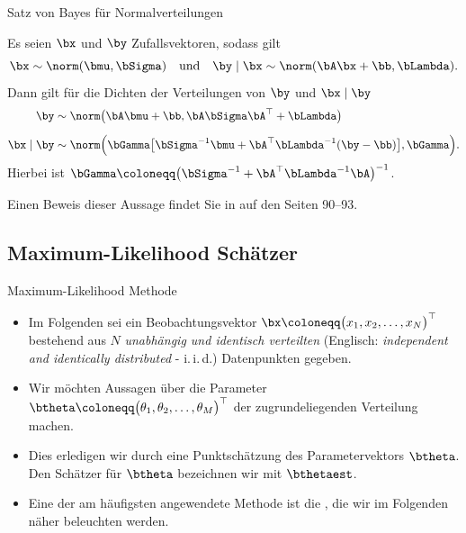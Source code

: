 \begin{frame}{Satz von Bayes für Normalverteilungen}{}
	\begin{mytheo}
		Es seien $\bx$ und $\by$ Zufallsvektoren, sodass gilt
		\begin{equation*}
			\bx \sim \norm(\bmu, \bSigma)
		\quad\text{und}\quad
			\by \mid \bx \sim \norm(\bA \bx + \bb, \bLambda).
		\end{equation*}
		Dann gilt für die Dichten der Verteilungen von $\by$ und $\bx \mid \by$
		\begin{align*}
			\by
				&\sim \norm\bigl( \bA \bmu + \bb, \bA \bSigma \bA^\top + \bLambda \bigr)
		\\[2mm]
			\bx \mid \by
				&\sim \norm\Bigl(
					\bGamma \bigl[ \bSigma^{-1} \bmu + \bA^\top \bLambda^{-1} (\by - \bb) \bigr],
					\bGamma
				\Bigr).
		\end{align*}
		Hierbei ist $\bGamma \coloneqq \bigl( \bSigma^{-1} + \bA^\top \bLambda^{-1} \bA \bigr)^{-1}$.
	\end{mytheo}

	\begin{myproof}
		Einen Beweis dieser Aussage findet Sie in \cite{Bishop2006} auf den Seiten 90--93.
	\end{myproof}
\end{frame}


\subsection{Maximum-Likelihood Schätzer}

\begin{frame}{Maximum-Likelihood Methode}{}
	\begin{itemize}
		\item Im Folgenden sei ein Beobachtungsvektor $\bx \coloneqq \bigl( x_1, x_2, \ldots, x_N \bigr)^\top$
			bestehend aus $N$ \textit{unabhängig und identisch verteilten}
			(Englisch: \textit{independent and identically distributed} - i.\,i.\,d.) Datenpunkten gegeben.
		\item Wir möchten Aussagen über die Parameter $\btheta \coloneqq \bigl( \theta_1, \theta_2, \ldots, \theta_M \bigr)^\top$
			der zugrundeliegenden Verteilung machen.
		\item Dies erledigen wir durch eine Punktschätzung des Parametervektors $\btheta$.
			Den Schätzer für $\btheta$ bezeichnen wir mit $\bthetaest$.
		\item Eine der am häufigsten angewendete Methode ist die ,
			die wir im Folgenden näher beleuchten werden.
	\end{itemize}
\end{frame}


